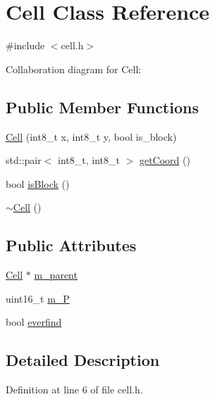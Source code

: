 \hypertarget{class_cell}{\section{Cell Class Reference}
\label{class_cell}
}


{\ttfamily \#include $<$cell.\-h$>$}



Collaboration diagram for Cell\-:
\subsection*{Public Member Functions}
\begin{DoxyCompactItemize}
\item 
\hyperlink{class_cell_aa773f7eb4e9ae0985291bf5332570f37}{Cell} (int8\-\_\-t x, int8\-\_\-t y, bool is\-\_\-block)
\item 
std\-::pair$<$ int8\-\_\-t, int8\-\_\-t $>$ \hyperlink{class_cell_a6cb8051b31ce00b7a7f2cc1b6e14d6a4}{get\-Coord} ()
\item 
bool \hyperlink{class_cell_aa7cf3f2e7c09c75764d8934d530c4863}{is\-Block} ()
\item 
\hyperlink{class_cell_a9fa559f7a28e2b4336c6879ca09304d8}{$\sim$\-Cell} ()
\end{DoxyCompactItemize}
\subsection*{Public Attributes}
\begin{DoxyCompactItemize}
\item 
\hyperlink{class_cell}{Cell} $\ast$ \hyperlink{class_cell_a1d30ec2a94e3ba2bec541d978f55c9bc}{m\-\_\-parent}
\item 
uint16\-\_\-t \hyperlink{class_cell_aa47b258f5356e76a577a5035b6e1cf59}{m\-\_\-\-P}
\item 
bool \hyperlink{class_cell_a1c2a62d76f46eb90b5d128fe30286e51}{everfind}
\end{DoxyCompactItemize}


\subsection{Detailed Description}


Definition at line 6 of file cell.\-h.



